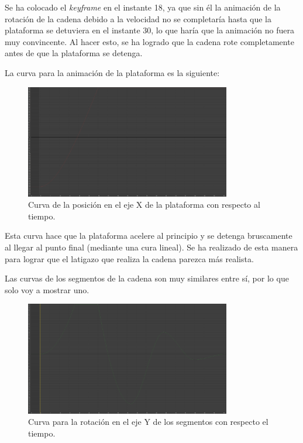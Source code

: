 \documentclass{article}
\begin{document}
\bigskip

Se ha colocado el \textit{keyframe} en el instante 18, ya que sin él la animación de la rotación de la cadena debido a la velocidad no se completaría hasta que la plataforma se detuviera en el instante 30, lo que haría que la animación no fuera muy convincente. Al hacer esto, se ha logrado que la cadena rote completamente antes de que la plataforma se detenga.

\bigskip
La curva para la animación de la plataforma es la siguiente:

\begin{figure}[H]
    \centering
    \includegraphics[width=0.8\textwidth]{imagenes/Ejercicio4/curvas/base/red.png}
    \caption{Curva de la posición en el eje X de la plataforma con respecto al tiempo.}
\end{figure}

\bigskip

Esta curva hace que la plataforma acelere al principio y se detenga bruscamente al llegar al punto final (mediante una cura lineal). Se ha realizado de esta manera para lograr que el latigazo que realiza la cadena parezca más realista.

\newpage

Las curvas de los segmentos de la cadena son muy similares entre sí, por lo que solo voy a mostrar uno.

\begin{figure}[H]
    \centering
    \includegraphics[width=0.8\textwidth]{imagenes/Ejercicio4/curvas/segmentos/green.png}
    \caption{Curva para la rotación en el eje Y de los segmentos con respecto el tiempo.}
\end{figure}
\end{document}
